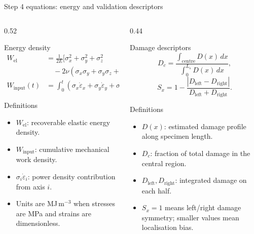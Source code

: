 \documentclass[11pt,aspectratio=169]{beamer}
\begin{document}
\begin{frame}{Step 4 equations: energy and validation descriptors}
  \scriptsize
  \begin{columns}[T,onlytextwidth]
    \begin{column}{0.52\textwidth}
      \begin{block}{Energy density}
        \[
          \begin{aligned}
          W_{\mathrm{el}} &=
          \frac{1}{2E}\Big[
          \sigma_x^2+\sigma_y^2+\sigma_z^2 \\
          &\quad -2\nu(\sigma_x\sigma_y+\sigma_y\sigma_z+\sigma_z\sigma_x)
          \Big],\\
          W_{\mathrm{input}}(t)&=
          \int_0^t
          \left(\sigma_x\dot{\varepsilon}_x+
          \sigma_y\dot{\varepsilon}_y+
          \sigma_z\dot{\varepsilon}_z\right)d\tau .
          \end{aligned}
        \]
      \end{block}
      \begin{block}{Definitions}
        \begin{itemize}
          \item $W_{\mathrm{el}}$: recoverable elastic energy density.
          \item $W_{\mathrm{input}}$: cumulative mechanical work density.
          \item $\sigma_i\dot{\varepsilon}_i$: power density contribution from axis $i$.
          \item Units are MJ\,m$^{-3}$ when stresses are MPa and strains are dimensionless.
        \end{itemize}
      \end{block}
    \end{column}
    \begin{column}{0.44\textwidth}
      \begin{exampleblock}{Damage descriptors}
        \[
          D_c=\frac{\int_{\mathrm{centre}}D(x)\,dx}
          {\int_0^{L_s}D(x)\,dx},
        \]
        \[
          S_x=1-
          \frac{|D_{\mathrm{left}}-D_{\mathrm{right}}|}
          {D_{\mathrm{left}}+D_{\mathrm{right}}}.
        \]
      \end{exampleblock}
      \begin{block}{Definitions}
        \begin{itemize}
          \item $D(x)$: estimated damage profile along specimen length.
          \item $D_c$: fraction of total damage in the central region.
          \item $D_{\mathrm{left}},D_{\mathrm{right}}$: integrated damage on each half.
          \item $S_x=1$ means left/right damage symmetry; smaller values mean localisation bias.
        \end{itemize}
      \end{block}
    \end{column}
  \end{columns}
\end{frame}
\end{document}
